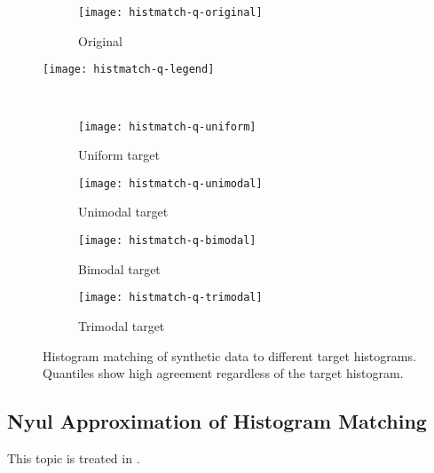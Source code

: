 \begin{figure}
  \centering
  \begin{subfigure}{\plotwidth}\texttt{[image: histmatch-q-original]}\caption{Original}\end{subfigure}
  \parbox[c]{\plotwidth}{\texttt{[image: histmatch-q-legend]}}\\
  \begin{subfigure}{\plotwidth}\texttt{[image: histmatch-q-uniform]} \caption{Uniform target} \end{subfigure}
  \begin{subfigure}{\plotwidth}\texttt{[image: histmatch-q-unimodal]}\caption{Unimodal target}\end{subfigure}
  \begin{subfigure}{\plotwidth}\texttt{[image: histmatch-q-bimodal]} \caption{Bimodal target} \end{subfigure}
  \begin{subfigure}{\plotwidth}\texttt{[image: histmatch-q-trimodal]}\caption{Trimodal target}\end{subfigure}
  \caption{Histogram matching of synthetic data to different target histograms. Quantiles show high agreement regardless of the target histogram.}
  \label{fig:hm-vs-he}
\end{figure}
\subsection{Nyul Approximation of Histogram Matching}\label{ss:nyul-approx}
This topic is treated in \cite{Knight2017}.

